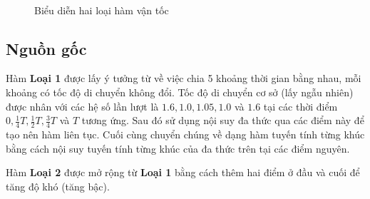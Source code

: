 \documentclass[../main.tex]{subfiles}
\begin{document}
\begin{figure}
  \centering

  \\


  \caption{Biểu diễn hai loại hàm vận tốc}
  \label{fig:11}
\end{figure}

\subsection{Nguồn gốc}\label{nguux1ed3n-gux1ed1c-cux1ee7a-cuxe1c-huxe0m-thux1eddi-gian}

Hàm \textbf{Loại 1} được lấy ý tưởng từ \cite{figliozzi2012time} về
việc chia 5 khoảng thời gian bằng nhau, mỗi khoảng có tốc độ di chuyển
không đổi. Tốc độ di chuyển cơ sở (lấy ngẫu nhiên) được nhân với các hệ
số lần lượt là \(1.6, 1.0, 1.05, 1.0\) và \(1.6\) tại các thời điểm
\(0, \frac 1 4 T, \frac 1 2 T, \frac 3 4 T\) và \(T\) tương ứng. Sau đó sử dụng nội suy đa
thức qua các điểm này để tạo nên hàm liên tục. Cuối cùng chuyển chúng về
dạng hàm tuyến tính từng khúc bằng cách nội suy tuyến tính từng khúc của
đa thức trên tại các điểm nguyên.

Hàm \textbf{Loại 2} được mở rộng từ \textbf{Loại 1} bằng cách thêm hai
điểm ở đầu và cuối để tăng độ khó (tăng bậc).
\end{document}
